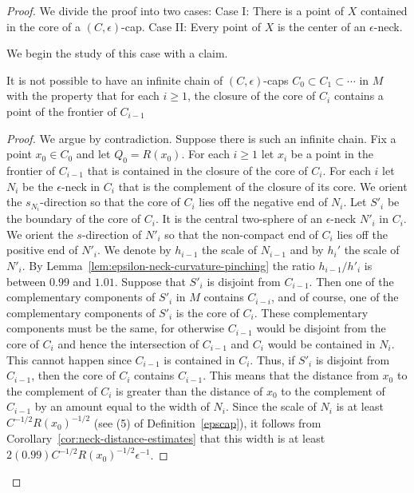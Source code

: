 \begin{proof}
We divide the proof into two cases: Case I: There is a point of $X$
contained in the core of a $(C,\epsilon)$-cap. Case II: Every point
of $X$ is the center of an $\epsilon$-neck.

 We begin the study of this case with a claim.

\begin{claim}
\label{claim:no-infinite-chain-of-caps}
It is not possible to have an infinite chain of $(C,\epsilon)$-caps
$C_0\subset C_1\subset \cdots$ in $M$ with the property that for
each $i\ge 1$, the closure of the core of $C_i$ contains a point of
the frontier of $C_{i-1}$
\end{claim}

\begin{proof}
We argue by contradiction. Suppose there is such an infinite chain.
Fix a point $x_0\in C_0$ and let $Q_0=R(x_0)$. For each $i\ge 1$ let
$x_i$ be a point in the frontier of $C_{i-1}$ that is contained in
the closure of the core of $C_i$. For each $i$ let $N_i$ be the
$\epsilon$-neck in $C_{i}$ that is the complement of the closure of
its core. We orient the $s_{N_{i}}$-direction so that the core of
$C_{i}$ lies off the negative end of $N_{i}$. Let $S'_i$ be the
boundary of the core of $C_i$. It is the central two-sphere of an
$\epsilon$-neck $N'_i$ in $C_i$. We orient the $s$-direction of
$N'_i$ so that the non-compact end of $C_i$ lies off the positive
end of $N'_i$. We denote by $h_{i-1}$ the scale of $N_{i-1}$ and by
$h_i'$ the scale of $N'_i$. By Lemma~\ref{lem:epsilon-neck-curvature-pinching} the ratio
$h_{i-1}/h'_i$ is between $0.99$ and $1.01$. Suppose that $S'_i$ is
disjoint from $C_{i-1}$. Then one of the complementary components of
$S'_i$ in $M$ contains $C_{i-i}$, and of course, one of the
complementary components of $S'_i$ is the core of $C_i$. These
complementary components must be the same, for otherwise $C_{i-1}$
would be disjoint from the core of $C_i$ and hence the intersection
of $C_{i-1}$ and $C_i$ would be contained in $N_i$. This cannot
happen since  $C_{i-1}$ is contained in $C_i$. Thus, if $S'_i$ is
disjoint from $C_{i-1}$, then the core of $C_i$ contains $C_{i-1}$.
 This means that the distance from $x_0$ to the
complement of $C_i$ is greater than the distance of $x_0$ to the
complement of $C_{i-1}$ by an amount equal to the width of $N_i$.
Since the scale of $N_i$ is at least $C^{-1/2}R(x_0)^{-1/2}$ (see
(5) of Definition~\ref{epscap}), it follows from
Corollary~\ref{cor:neck-distance-estimates} that this width is at least
$2(0.99)C^{-1/2}R(x_0)^{-1/2}\epsilon^{-1}$.


\end{proof}
\end{proof}
